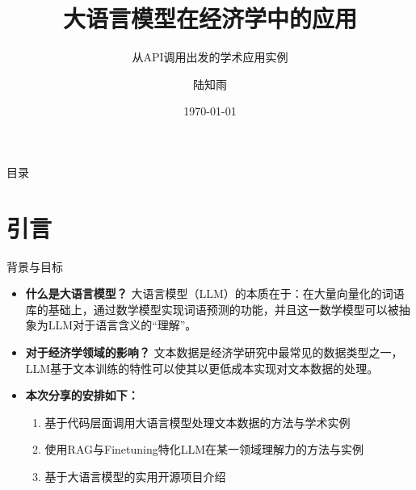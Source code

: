 \documentclass{beamer}
\title[LLMs in Economics]{\textbf{大语言模型在经济学中的应用}}
\subtitle{从API调用出发的学术应用实例}
\author{陆知雨}
\institute{中国财政发展协同创新中心\\
\vspace{2mm}财政学基地班22}
\date{\today}
\begin{document}
\begin{frame}
  \titlepage
\end{frame}

\begin{frame}{目录}
    \tableofcontents[hideallsubsections]
\end{frame}

\section{引言}
\begin{frame}{背景与目标}
  \begin{itemize}
    \item \textbf{什么是大语言模型？} 大语言模型（LLM）的本质在于：在大量向量化的词语库的基础上，通过数学模型实现词语预测的功能，并且这一数学模型可以被抽象为LLM对于语言含义的“理解”。
    \item \textbf{对于经济学领域的影响？} 文本数据是经济学研究中最常见的数据类型之一，LLM基于文本训练的特性可以使其以更低成本实现对文本数据的处理。
    \item \textbf{本次分享的安排如下：}
      \begin{enumerate}
        \item 基于代码层面调用大语言模型处理文本数据的方法与学术实例
        \item 使用RAG与Finetuning特化LLM在某一领域理解力的方法与实例
        \item 基于大语言模型的实用开源项目介绍
      \end{enumerate}
  \end{itemize}
\end{frame}

\end{document}
